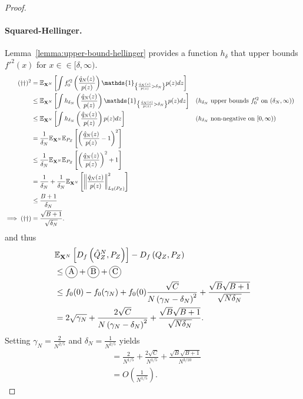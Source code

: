 \begin{proof}
\paragraph{Squared-Hellinger.}
Lemma~\ref{lemma:upper-bound-hellinger} provides a function $h_\delta$ that upper bounds $f'^2(x)$ for $x \in \in[\delta, \infty)$.
%
\begin{align*}
    (\dagger\dagger)^2 
    &= \E_{\XN} \left[\int f_0'^2\left(\frac{\hat{q}_N(z)}{p(z)} \right) \mathds{1}_{\left\lbrace \frac{\hat{q}_N(z)}{p(z)} > \delta_N \right\rbrace} p(z) dz \right]
    \\
    &\leq \E_{\XN} \left[\int h_{\delta_N}\left(\frac{\hat{q}_N(z)}{p(z)} \right) \mathds{1}_{\left\lbrace \frac{\hat{q}_N(z)}{p(z)} > \delta_N \right\rbrace} p(z) dz \right]
    && \text{($h_{\delta_N}$ upper bounds $f_0'^2$ on $(\delta_N, \infty)$)}
    \\
    &\leq \E_{\XN} \left[\int h_{\delta_N}\left(\frac{\hat{q}_N(z)}{p(z)} \right) p(z) dz \right]
    && \text{($h_{\delta_N}$ non-negative on $[0, \infty)$)}
    \\
    &= \frac{1}{\delta_N} \E_{\XN}\E_{P_Z} \left[ \left(\frac{\hat{q}_N(z)}{p(z)} - 1 \right)^2 \right] \\
    &\leq \frac{1}{\delta_N} \E_{\XN}\E_{P_Z} \left[ \left(\frac{\hat{q}_N(z)}{p(z)}\right)^2 + 1 \right] \\
    &= \frac{1}{\delta_N} + \frac{1}{\delta_N} \E_{\XN}\left[ \left\| \frac{\hat{q}_N(z)}{p(z)}\right\|^2_{L_2(P_Z)} \right]\\
    &\leq \frac{B + 1}{\delta_N} \\
    \implies (\dagger\dagger)&= \frac{\sqrt{B + 1}}{\sqrt{\delta_N}}.
\end{align*}
%
and thus
%
\begin{align*}
    &\E_{\XN} \left[ D_f\left( \hat{Q}_Z^N , P_Z\right)\right] - D_f\left( Q_{Z} , P_Z\right)\\
    &\leq \encircle{A} + \encircle{B} + \encircle{C} \\
    &\leq f_0(0) - f_0(\gamma_N) + f_0(0) \frac{\sqrt{C}}{N \left( \gamma_N - \delta_N \right)^2} + \frac{\sqrt{B}\sqrt{B + 1}}{\sqrt{N \delta_N}}\\
    &= 2\sqrt{\gamma_N}  + \frac{2\sqrt{C}}{N \left( \gamma_N - \delta_N \right)^2} + \frac{\sqrt{B}\sqrt{B + 1}}{\sqrt{N \delta_N}}.
\end{align*}
%
Setting $\gamma_N = \frac{2}{N^{2/5}}$ and $\delta_N = \frac{1}{N^{2/5}}$ yields
%
\begin{align*}
    &= \frac{2}{N^{1/5}}  + \frac{2\sqrt{C}}{N^{1/5}} + \frac{\sqrt{B}\sqrt{B + 1}}{N^{3/10}} \\
    & = O\left(\frac{1}{N^{1/5}} \right).
\end{align*}


\end{proof}
